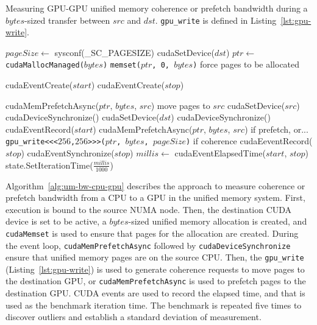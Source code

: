 \begin{algorithm}[H]
	\caption[Measuring GPU-GPU unified memory coherence or prefetch bandwidth]{
		Measuring GPU-GPU unified memory coherence or prefetch bandwidth during a $bytes$-sized transfer between $src$ and $dst$.
		\texttt{gpu\_write} is defined in Listing~\ref{lst:gpu-write}.
	}
	\label{alg:um-bw-gpu-gpu}
	\begin{algorithmic}[1]
		\Statex
		
		\State $pageSize \gets$ sysconf(\_SC\_PAGESIZE)
		\State cudaSetDevice($dst$)
		\State $ptr \gets$ \texttt{cudaMallocManaged($bytes$)}
		\State \texttt{memset($ptr$, 0, $bytes$)} \Comment force pages to be allocated

		\State cudaEventCreate($start$)
		\State cudaEventCreate($stop$)		        
				
			\State cudaMemPrefetchAsync($ptr$, $bytes$, $src$) \Comment move pages to $src$
			\State cudaSetDevice($src$)
			\State cudaDeviceSynchronize()
			\State cudaSetDevice($dst$)
			\State cudaDeviceSynchronize()
			\State cudaEventRecord($start$)
			\State cudaMemPrefetchAsync($ptr$, $bytes$, $src$) \Comment if prefetch, or...
			\State \texttt{gpu\_write<<<$256$,$256$>>>($ptr$, $bytes$, $pageSize$)} \Comment if coherence
			\State cudaEeventRecord($stop$)
			\State cudaEventSynchronize($stop$)
			\State $millis \gets$ cudaEventElapsedTime($start$, $stop$)
			\State state.SetIterationTime($\frac{millis}{1000}$)
		\EndFor
		\EndFunction			
	\end{algorithmic}
\end{algorithm}

Algorithm~\ref{alg:um-bw-cpu-gpu} describes the approach to measure coherence or prefetch bandwidth from a CPU to a GPU in the unified memory system.
First, execution is bound to the source NUMA node.
Then, the destination CUDA device is set to be active, a $bytes$-sized unified memory allocation is created, and \texttt{cudaMemset} is used to ensure that pages for the allocation are created.
During the event loop, \texttt{cudaMemPrefetchAsync} followed by \texttt{cudaDeviceSynchronize} ensure that unified memory pages are on the source CPU.
Then, the \texttt{gpu\_write} (Listing~\ref{lst:gpu-write}) is used to generate coherence requests to move pages to the destination GPU, or \texttt{cudaMemPrefetchAsync} is used to prefetch pages to the destination GPU.
CUDA events are used to record the elapsed time, and that is used as the benchmark iteration time.
The benchmark is repeated five times to discover outliers and establish a standard deviation of measurement.

